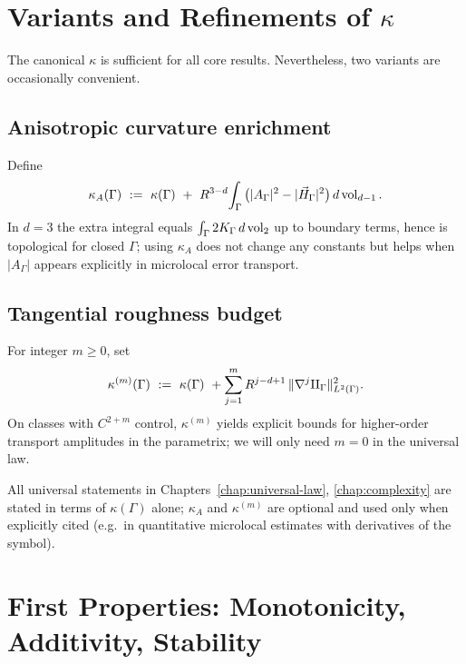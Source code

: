 \bigskip

\section{Variants and Refinements of \texorpdfstring{$\kappa$}{kappa}}
\label{sec:variants}

The canonical $\kappa$ is sufficient for all core results. Nevertheless, two variants are occasionally convenient.

\subsection{Anisotropic curvature enrichment}
Define
\[
\kappa_A(\Gamma)\ :=\ \kappa(\Gamma)\ +\ R^{3-d}\!\int_\Gamma \big(|A_\Gamma|^2-|\vec H_\Gamma|^2\big)\,d\vol_{d-1}.
\]
In $d=3$ the extra integral equals $\int_\Gamma 2K_\Gamma\,d\operatorname{vol}_{2}$ up to boundary terms, hence is topological for closed $\Gamma$; using $\kappa_A$ does not change any constants but helps when $|A_\Gamma|$ appears explicitly in microlocal error transport.

\subsection{Tangential roughness budget}
For integer $m\ge 0$, set
\[
\kappa^{(m)}(\Gamma)\ :=\ \kappa(\Gamma)\ +\sum_{j=1}^m R^{j-d+1}\,\|\nabla^j \II_\Gamma\|_{L^2(\Gamma)}^2.
\]
On classes with $C^{2+m}$ control, $\kappa^{(m)}$ yields explicit bounds for higher-order transport amplitudes in the parametrix; we will only need $m=0$ in the universal law.

\begin{remark}[Policy]
All universal statements in Chapters~\ref{chap:universal-law}, \ref{chap:complexity} are stated in terms of $\kappa(\Gamma)$ alone; $\kappa_A$ and $\kappa^{(m)}$ are optional and used only when explicitly cited (e.g.\ in quantitative microlocal estimates with derivatives of the symbol).
\end{remark}

\bigskip

\section{First Properties: Monotonicity, Additivity, Stability}
\label{sec:properties}

